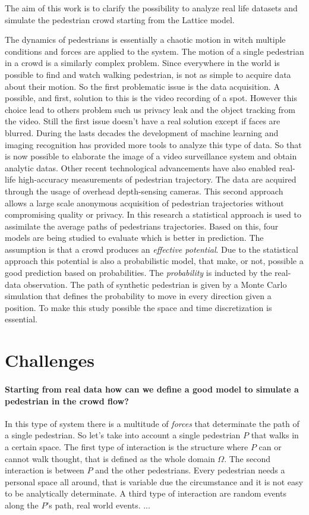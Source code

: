 \documentclass[class=article, crop=false]{standalone}
\begin{document}
The aim of this work is to clarify the possibility to analyze real life datasets and simulate the pedestrian crowd starting from the Lattice model.

The dynamics of pedestrians is essentially a chaotic motion in witch multiple conditions and forces are applied to the system.
The motion of a single pedestrian in a crowd is a similarly complex problem.
Since everywhere in the world is possible to find and watch walking pedestrian, is not as simple to acquire data about their motion.
So the first problematic issue is the data acquisition.
A possible, and first, solution to this is the video recording of a spot.
However this choice lead to others problem such us privacy leak and the object tracking from the video.
Still the first issue doesn't have a real solution except if faces are blurred.
During the lasts decades the development of machine learning and imaging recognition has provided more tools to analyze this type of data.
So that is now possible to elaborate the image of a video surveillance system and obtain analytic datas.
Other recent technological advancements have also enabled real-life high-accuracy measurements of pedestrian trajectory.
The data are acquired through the usage of overhead depth-sensing cameras.
This second approach allows a large scale anonymous acquisition of pedestrian trajectories without compromising quality or privacy.
In this research a statistical approach is used to assimilate the average paths of pedestrians trajectories.
Based on this, four models are being studied to evaluate which is better in prediction.
The assumption is that a crowd produces an \emph{effective potential}. 
Due to the statistical approach this potential is also a probabilistic model, that make, or not, possible a good prediction based on probabilities.
The \emph{probability} is inducted by the real-data observation.
The path of synthetic pedestrian is given by a Monte Carlo simulation that defines the probability to move in every direction given a position.
To make this study possible the space and time discretization is essential.



\section{Challenges}

\paragraph{Starting from real data how can we define a good model to simulate a pedestrian in the crowd flow?}
In this type of system there is a multitude of \emph{forces} that determinate the path of a single pedestrian.
So let's take into account a single pedestrian $P$ that walks in a certain space.
The first type of interaction is the structure where $P$ can or cannot walk thought, that is defined as the whole domain $\Omega$.
The second interaction is between $P$ and the other pedestrians.
Every pedestrian needs a personal space all around, that is variable due the circumstance and it is not easy to be analytically determinate.
A third type of interaction are random events along the $P$'s path, real world events.
...
\end{document}
